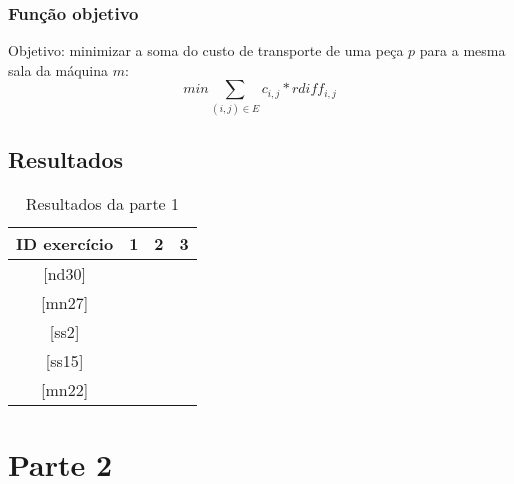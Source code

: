 \documentclass[11pt,letterpaper]{article}
\begin{document}
\subsubsection*{Função objetivo}
Objetivo: minimizar a soma do custo de transporte de uma peça $p$ para
a mesma sala da máquina $m$:
\begin{equation}
min\sum_{(i,j) \in E}c_{i,j}*rdiff_{i,j}
\end{equation}



\subsection{Resultados}


\begin{table}[h!]
\begin{centering}
\begin{tabular}{|c|c|c|c|}
\hline 
ID exercício & 1 & 2 & 3\tabularnewline
\hline 
\hline 
{[}nd30{]}  &  &  & \tabularnewline
\hline 
 {[}mn27{]} &  &  & \tabularnewline
\hline 
 {[}ss2{]} &  &  & \tabularnewline
\hline 
{[}ss15{]} &  &  & \tabularnewline
\hline 
 {[}mn22{]} &  &  & \tabularnewline
\hline 
\end{tabular}
\par\end{centering}

\caption{Resultados da parte 1}
\end{table}


\section{Parte 2}



%
%  
\end{document}
